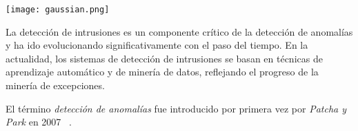 \noindent
\begin{minipage}{\linewidth}
	\centering
	\texttt{[image: gaussian.png]}
	\label{fig:fig1}
\end{minipage}
\vspace{1\baselineskip}

La detección de intrusiones es un componente crítico de la detección de anomalías y ha ido evolucionando
significativamente con el paso del tiempo. En la actualidad, los sistemas de detección de intrusiones
se basan en técnicas de aprendizaje automático y de minería de datos, reflejando el progreso de la minería
de excepciones.

El término \textit{detección de anomalías} fue introducido por primera vez por \textit{Patcha y Park} en 2007
~\cite{patcha2007overview}.
